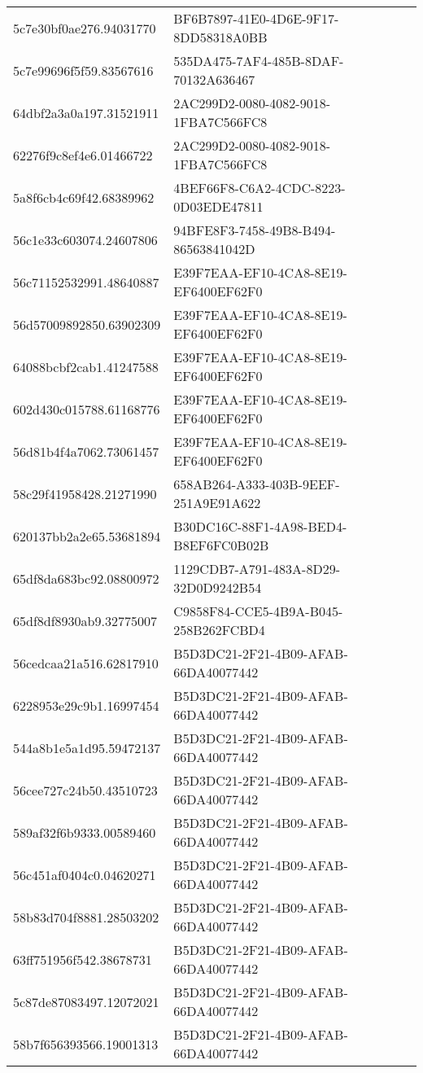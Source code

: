 \begin{tabular}{ll}
5c7e30bf0ae276.94031770 & BF6B7897-41E0-4D6E-9F17-8DD58318A0BB \\
5c7e99696f5f59.83567616 & 535DA475-7AF4-485B-8DAF-70132A636467 \\
64dbf2a3a0a197.31521911 & 2AC299D2-0080-4082-9018-1FBA7C566FC8 \\
62276f9c8ef4e6.01466722 & 2AC299D2-0080-4082-9018-1FBA7C566FC8 \\
5a8f6cb4c69f42.68389962 & 4BEF66F8-C6A2-4CDC-8223-0D03EDE47811 \\
56c1e33c603074.24607806 & 94BFE8F3-7458-49B8-B494-86563841042D \\
56c71152532991.48640887 & E39F7EAA-EF10-4CA8-8E19-EF6400EF62F0 \\
56d57009892850.63902309 & E39F7EAA-EF10-4CA8-8E19-EF6400EF62F0 \\
64088bcbf2cab1.41247588 & E39F7EAA-EF10-4CA8-8E19-EF6400EF62F0 \\
602d430c015788.61168776 & E39F7EAA-EF10-4CA8-8E19-EF6400EF62F0 \\
56d81b4f4a7062.73061457 & E39F7EAA-EF10-4CA8-8E19-EF6400EF62F0 \\
58c29f41958428.21271990 & 658AB264-A333-403B-9EEF-251A9E91A622 \\
620137bb2a2e65.53681894 & B30DC16C-88F1-4A98-BED4-B8EF6FC0B02B \\
65df8da683bc92.08800972 & 1129CDB7-A791-483A-8D29-32D0D9242B54 \\
65df8df8930ab9.32775007 & C9858F84-CCE5-4B9A-B045-258B262FCBD4 \\
56cedcaa21a516.62817910 & B5D3DC21-2F21-4B09-AFAB-66DA40077442 \\
6228953e29c9b1.16997454 & B5D3DC21-2F21-4B09-AFAB-66DA40077442 \\
544a8b1e5a1d95.59472137 & B5D3DC21-2F21-4B09-AFAB-66DA40077442 \\
56cee727c24b50.43510723 & B5D3DC21-2F21-4B09-AFAB-66DA40077442 \\
589af32f6b9333.00589460 & B5D3DC21-2F21-4B09-AFAB-66DA40077442 \\
56c451af0404c0.04620271 & B5D3DC21-2F21-4B09-AFAB-66DA40077442 \\
58b83d704f8881.28503202 & B5D3DC21-2F21-4B09-AFAB-66DA40077442 \\
63ff751956f542.38678731 & B5D3DC21-2F21-4B09-AFAB-66DA40077442 \\
5c87de87083497.12072021 & B5D3DC21-2F21-4B09-AFAB-66DA40077442 \\
58b7f656393566.19001313 & B5D3DC21-2F21-4B09-AFAB-66DA40077442 \\

\end{tabular}
